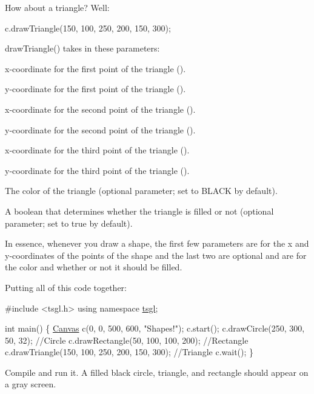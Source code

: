 How about a triangle? Well\+:


\begin{DoxyCode}
c.drawTriangle(150, 100, 250, 200, 150, 300);
\end{DoxyCode}


draw\+Triangle() takes in these parameters\+:


\begin{DoxyItemize}
\item x-\/coordinate for the first point of the triangle ({}).
\item y-\/coordinate for the first point of the triangle ({}).
\item x-\/coordinate for the second point of the triangle ({}).
\item y-\/coordinate for the second point of the triangle ({}).
\item x-\/coordinate for the third point of the triangle ({}).
\item y-\/coordinate for the third point of the triangle ({}).
\item The color of the triangle (optional parameter; set to {\ttfamily B\+L\+A\+C\+K} by default).
\item A boolean that determines whether the triangle is filled or not (optional parameter; set to {\ttfamily true} by default).
\end{DoxyItemize}

In essence, whenever you draw a shape, the first few parameters are for the x and y-\/coordinates of the points of the shape and the last two are optional and are for the color and whether or not it should be filled.

Putting all of this code together\+:


\begin{DoxyCode}
\textcolor{preprocessor}{#include <tsgl.h>}
\textcolor{keyword}{using namespace }\hyperlink{namespacetsgl}{tsgl};

\textcolor{keywordtype}{int} main() \{
  \hyperlink{classtsgl_1_1_canvas}{Canvas} c(0, 0, 500, 600, \textcolor{stringliteral}{"Shapes!"});
  c.start();
  c.drawCircle(250, 300, 50, 32);  \textcolor{comment}{//Circle}
  c.drawRectangle(50, 100, 100, 200);  \textcolor{comment}{//Rectangle}
  c.drawTriangle(150, 100, 250, 200, 150, 300);  \textcolor{comment}{//Triangle}
  c.wait();
\}
\end{DoxyCode}


Compile and run it. A filled black circle, triangle, and rectangle should appear on a gray screen.


